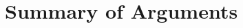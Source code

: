 \documentclass[12pt, letterpaper]{article}
\begin{document}
\section*{Summary of Arguments}
\end{document}
